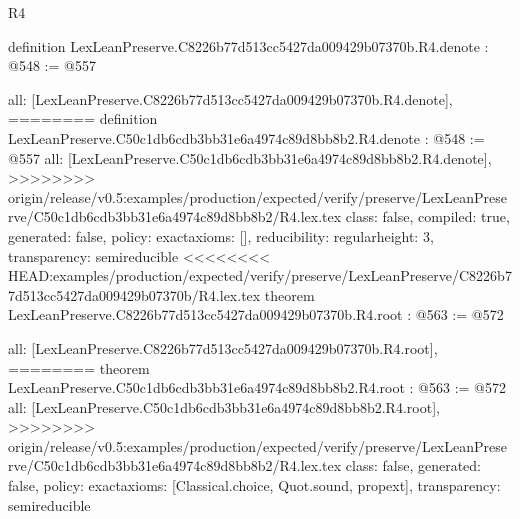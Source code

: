 \begin{lexlean}{R4}
\begin{coremodule}
{{{{{{definition LexLeanPreserve.C8226b77d513cc5427da009429b07370b.R4.denote : @548 := @557 {
  all: [LexLeanPreserve.C8226b77d513cc5427da009429b07370b.R4.denote],
========
definition LexLeanPreserve.C50c1db6cdb3bb31e6a4974c89d8bb8b2.R4.denote : @548 := @557 {
  all: [LexLeanPreserve.C50c1db6cdb3bb31e6a4974c89d8bb8b2.R4.denote],
>>>>>>>> origin/release/v0.5:examples/production/expected/verify/preserve/LexLeanPreserve/C50c1db6cdb3bb31e6a4974c89d8bb8b2/R4.lex.tex
  class: false,
  compiled: true,
  generated: false,
  policy: exact{axioms: []},
  reducibility: regular{height: 3},
  transparency: semireducible
}
<<<<<<<< HEAD:examples/production/expected/verify/preserve/LexLeanPreserve/C8226b77d513cc5427da009429b07370b/R4.lex.tex
theorem LexLeanPreserve.C8226b77d513cc5427da009429b07370b.R4.root : @563 := @572 {
  all: [LexLeanPreserve.C8226b77d513cc5427da009429b07370b.R4.root],
========
theorem LexLeanPreserve.C50c1db6cdb3bb31e6a4974c89d8bb8b2.R4.root : @563 := @572 {
  all: [LexLeanPreserve.C50c1db6cdb3bb31e6a4974c89d8bb8b2.R4.root],
>>>>>>>> origin/release/v0.5:examples/production/expected/verify/preserve/LexLeanPreserve/C50c1db6cdb3bb31e6a4974c89d8bb8b2/R4.lex.tex
  class: false,
  generated: false,
  policy: exact{axioms: [Classical.choice, Quot.sound, propext]},
  transparency: semireducible
}

}}}}}}}}
\end{coremodule}
\end{lexlean}
